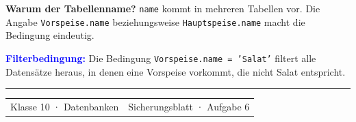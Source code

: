 \documentclass[10pt,a4paper]{article}
\begin{document}
\vspace{1.2mm}
{\small\textcolor{Muted}{\textbf{Warum der Tabellenname?} \texttt{name} kommt in mehreren Tabellen vor. Die Angabe \texttt{Vorspeise.name} beziehungsweise \texttt{Hauptspeise.name} macht die Bedingung eindeutig.}}\par\vspace{1.0mm}
\colorbox{Sky}{\parbox{\dimexpr\linewidth-2\fboxsep\relax}{\vspace{1.3mm}\small
\textcolor{Blue}{\bfseries Filterbedingung:} Die Bedingung \texttt{Vorspeise.name = 'Salat'} filtert alle Datensätze heraus, in denen eine Vorspeise vorkommt, die nicht Salat entspricht.\vspace{1.3mm}}}

\vfill{\color{Line}\rule{\linewidth}{.5pt}}\par\vspace{1.5mm}
\begin{tabularx}{\linewidth}{@{}Xr@{}}{\small\color{Muted}Klasse 10 · Datenbanken} & {\small\color{Muted}Sicherungsblatt · Aufgabe 6}\end{tabularx}
\end{document}
